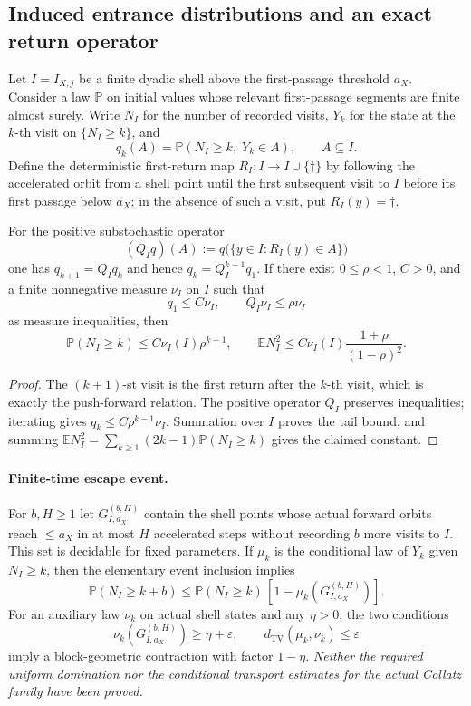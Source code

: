 \subsection*{Induced entrance distributions and an exact return operator}
Let $I=I_{X,j}$ be a finite dyadic shell above the first-passage
threshold $a_X$. Consider a law $\mathbb P$ on initial values whose
relevant first-passage segments are finite almost surely. Write $N_I$
for the number of recorded visits, $Y_k$ for the state at the $k$-th
visit on $\{N_I\ge k\}$, and
\[
  q_k(A)=\mathbb P(N_I\ge k,\;Y_k\in A),\qquad A\subseteq I.
\]
Define the deterministic first-return map $R_I:I\to I\cup\{\dagger\}$
by following the accelerated orbit from a shell point until the first
subsequent visit to $I$ before its first passage below $a_X$; in the
absence of such a visit, put $R_I(y)=\dagger$.

\begin{proposition}
For the positive substochastic operator
\[
  (Q_I q)(A):=q\bigl(\{y\in I:R_I(y)\in A\}\bigr)
\]
one has $q_{k+1}=Q_Iq_k$ and hence $q_k=Q_I^{k-1}q_1$.
If there exist $0\le\rho<1$, $C>0$, and a finite nonnegative measure
$\nu_I$ on $I$ such that
\[
  q_1\le C\nu_I,\qquad Q_I\nu_I\le\rho\nu_I
\]
as measure inequalities, then
\[
 \mathbb P(N_I\ge k)\le C\nu_I(I)\rho^{k-1},\qquad
 \mathbb E N_I^2\le C\nu_I(I)\frac{1+\rho}{(1-\rho)^2}.
\]
\end{proposition}
\begin{proof}
The $(k+1)$-st visit is the first return after the $k$-th visit,
which is exactly the push-forward relation. The positive operator
$Q_I$ preserves inequalities; iterating gives
$q_k\le C\rho^{k-1}\nu_I$. Summation over $I$ proves the tail bound,
and summing $\mathbb E N_I^2=\sum_{k\ge1}(2k-1)\mathbb P(N_I\ge k)$
gives the claimed constant.
\end{proof}

\paragraph{Finite-time escape event.}
For $b,H\ge1$ let $G^{(b,H)}_{I,a_X}$ contain the shell points whose
actual forward orbits reach $\le a_X$ in at most $H$ accelerated steps
without recording $b$ more visits to $I$. This set is decidable for
fixed parameters. If $\mu_k$ is the conditional law of $Y_k$ given
$N_I\ge k$, then the elementary event inclusion implies
\[
  \mathbb P(N_I\ge k+b)
   \le\mathbb P(N_I\ge k)\,[1-\mu_k(G^{(b,H)}_{I,a_X})].
\]
For an auxiliary law $\nu_k$ on actual shell states and any $\eta>0$,
the two conditions
\[
 \nu_k(G^{(b,H)}_{I,a_X})\ge\eta+\varepsilon,\qquad
 d_{\mathrm{TV}}(\mu_k,\nu_k)\le\varepsilon
\]
imply a block-geometric contraction with factor $1-\eta$.
\emph{Neither the required uniform domination nor the conditional
transport estimates for the actual Collatz family have been proved.}
